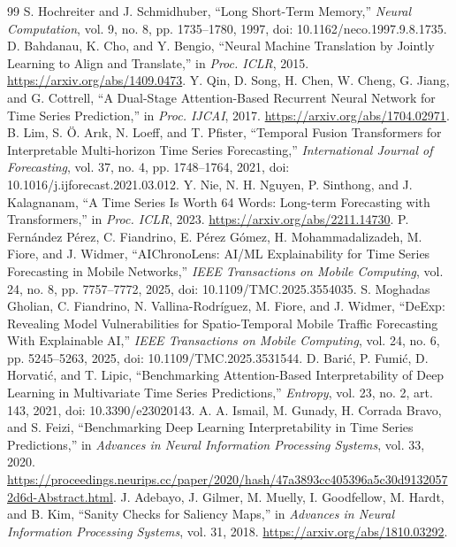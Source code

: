 \documentclass[conference]{IEEEtran}
\begin{document}
\begin{thebibliography}{99}
 S. Hochreiter and J. Schmidhuber, ``Long Short-Term Memory,'' \emph{Neural Computation}, vol. 9, no. 8, pp. 1735--1780, 1997, doi: 10.1162/neco.1997.9.8.1735.
 D. Bahdanau, K. Cho, and Y. Bengio, ``Neural Machine Translation by Jointly Learning to Align and Translate,'' in \emph{Proc. ICLR}, 2015. \url{https://arxiv.org/abs/1409.0473}.
 Y. Qin, D. Song, H. Chen, W. Cheng, G. Jiang, and G. Cottrell, ``A Dual-Stage Attention-Based Recurrent Neural Network for Time Series Prediction,'' in \emph{Proc. IJCAI}, 2017. \url{https://arxiv.org/abs/1704.02971}.
 B. Lim, S. \"O. Ar\i k, N. Loeff, and T. Pfister, ``Temporal Fusion Transformers for Interpretable Multi-horizon Time Series Forecasting,'' \emph{International Journal of Forecasting}, vol. 37, no. 4, pp. 1748--1764, 2021, doi: 10.1016/j.ijforecast.2021.03.012.
 Y. Nie, N. H. Nguyen, P. Sinthong, and J. Kalagnanam, ``A Time Series Is Worth 64 Words: Long-term Forecasting with Transformers,'' in \emph{Proc. ICLR}, 2023. \url{https://arxiv.org/abs/2211.14730}.
 P. Fern\'andez P\'erez, C. Fiandrino, E. P\'erez G\'omez, H. Mohammadalizadeh, M. Fiore, and J. Widmer, ``AIChronoLens: AI/ML Explainability for Time Series Forecasting in Mobile Networks,'' \emph{IEEE Transactions on Mobile Computing}, vol. 24, no. 8, pp. 7757--7772, 2025, doi: 10.1109/TMC.2025.3554035.
 S. Moghadas Gholian, C. Fiandrino, N. Vallina-Rodr\'iguez, M. Fiore, and J. Widmer, ``DeExp: Revealing Model Vulnerabilities for Spatio-Temporal Mobile Traffic Forecasting With Explainable AI,'' \emph{IEEE Transactions on Mobile Computing}, vol. 24, no. 6, pp. 5245--5263, 2025, doi: 10.1109/TMC.2025.3531544.
 D. Bari\'c, P. Fumi\'c, D. Horvati\'c, and T. Lipic, ``Benchmarking Attention-Based Interpretability of Deep Learning in Multivariate Time Series Predictions,'' \emph{Entropy}, vol. 23, no. 2, art. 143, 2021, doi: 10.3390/e23020143.
 A. A. Ismail, M. Gunady, H. Corrada Bravo, and S. Feizi, ``Benchmarking Deep Learning Interpretability in Time Series Predictions,'' in \emph{Advances in Neural Information Processing Systems}, vol. 33, 2020. \url{https://proceedings.neurips.cc/paper/2020/hash/47a3893cc405396a5c30d91320572d6d-Abstract.html}.
 J. Adebayo, J. Gilmer, M. Muelly, I. Goodfellow, M. Hardt, and B. Kim, ``Sanity Checks for Saliency Maps,'' in \emph{Advances in Neural Information Processing Systems}, vol. 31, 2018. \url{https://arxiv.org/abs/1810.03292}.

\end{thebibliography}
\end{document}
